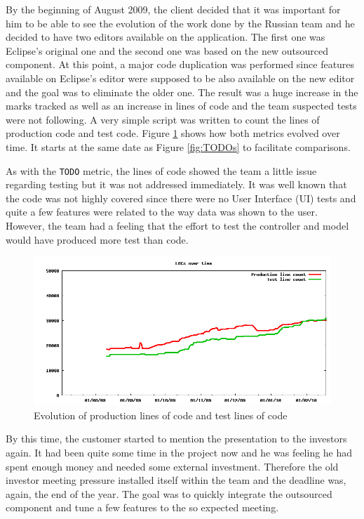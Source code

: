 \documentclass[lnbip]{svmultln}
\begin{document}
By the beginning of August 2009, the client decided that it was
important for him to be able to see the evolution of the work done by
the Russian team and he decided to have two editors available on the
application. The first one was Eclipse's original one and the second
one was based on the new outsourced component. At this point, a major
code duplication was performed since features available on Eclipse's
editor were supposed to be also available on the new editor and the
goal was to eliminate the older one. The result was a huge increase in
the marks tracked as well as an increase in lines of code and the team
suspected tests were not following. A very simple script was written
to count the lines of production code and test code. Figure
\ref{fig:LOCs} shows how both metrics evolved over time. It starts at
the same date as Figure \ref{fig:TODOs} to facilitate comparisons.

As with the \texttt{TODO} metric, the lines of code showed the team a
little issue regarding testing but it was not addressed
immediately. It was well known that the code was not highly covered
since there were no User Interface (UI) tests and quite a few features
were related to the way data was shown to the user. However, the team
had a feeling that the effort to test the controller and model would
have produced more test than code.

\begin{figure}[hbt]
  \centerline{
    \includegraphics[width=120mm]{LOCs.png}
  }
  \caption{Evolution of production lines of code and test lines of
    code}
  \label{fig:LOCs}
\end{figure}

By this time, the customer started to mention the presentation to the
investors again. It had been quite some time in the project now and he
was feeling he had spent enough money and needed some external
investment. Therefore the old investor meeting pressure installed
itself within the team and the deadline was, again, the end of the
year. The goal was to quickly integrate the outsourced component and
tune a few features to the so expected meeting.
\end{document}
